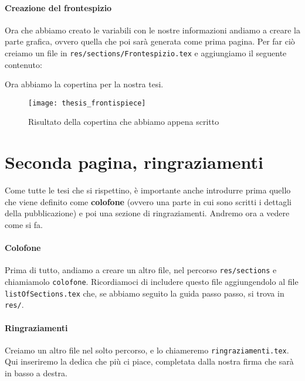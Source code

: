 

\paragraph*{Creazione del frontespizio} Ora che abbiamo creato le variabili con
le nostre informazioni andiamo a creare la parte grafica, ovvero quella che poi
sarà generata come prima pagina. Per far ciò creiamo un file in
\texttt{res/sections/Frontespizio.tex} e aggiungiamo il seguente contenuto:



\noindent Ora abbiamo la copertina per la nostra tesi.

\begin{figure}[t]
 \centering
 \texttt{[image: thesis\_frontispiece]}
 \caption[Frontespizio tesi]{Risultato della copertina che abbiamo appena
scritto}
 \label{img:thesis_frontispiece}
\end{figure}


\section{Seconda pagina, ringraziamenti}
Come tutte le tesi che si rispettino, è importante anche introdurre prima
quello che viene definito come \textbf{colofone} (ovvero una parte in cui sono
scritti i dettagli della pubblicazione) e poi una sezione di ringraziamenti.
Andremo ora a vedere come si fa.
\paragraph*{Colofone} Prima di tutto, andiamo a creare un altro
file, nel percorso \texttt{res/sections} e chiamiamolo \texttt{colofone}.
Ricordiamoci di includere questo file aggiungendolo al file
\texttt{listOfSections.tex} che, se abbiamo seguito la guida passo passo, si
trova in \texttt{res/}.



\paragraph*{Ringraziamenti} Creiamo un altro file nel solto percorso, e lo
chiameremo \texttt{ringraziamenti.tex}. Qui inseriremo la dedica che più ci
piace, completata dalla nostra firma che sarà in basso a destra.




